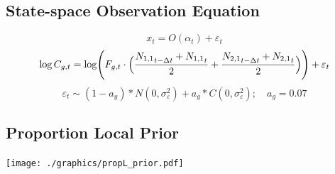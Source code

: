 \documentclass[a4paper,KOMA,landscape,titlepage]{powersem}
\newcommand\None{{N_{1,1}}}
\newcommand\Ntwo{{N_{2,1}}}
\begin{document}
\begin{slide}\section{State-space Observation Equation}
\begin{center}
\begin{equation}
x_t = O(\alpha_t) + \varepsilon_t
\end{equation}
\vspace{2ex}
\begin{equation}
\log C_{g,t} = \log \Biggl(F_{g,t}\cdot\Bigl(\frac{\None_{t-\Delta t}+\None_t}{2}
                           +\frac{\Ntwo_{t-\Delta
t}+\Ntwo_t}{2}\Bigr)\Biggr) + \varepsilon_t
\label{eqn:obs}
\end{equation}
\begin{equation}
\varepsilon_t \sim
(1-a_g)*N(0,\sigma^2_\varepsilon)+a_g*C(0,\sigma^2_\varepsilon);\quad a_g =
0.07
\end{equation}
\end{center}
\end{slide}

\begin{slide}\section{Proportion Local Prior}
\begin{center}
\label{fig:propLprior}
\texttt{[image: ./graphics/propL\_prior.pdf]}
\end{center}
\end{slide}
\end{document}
